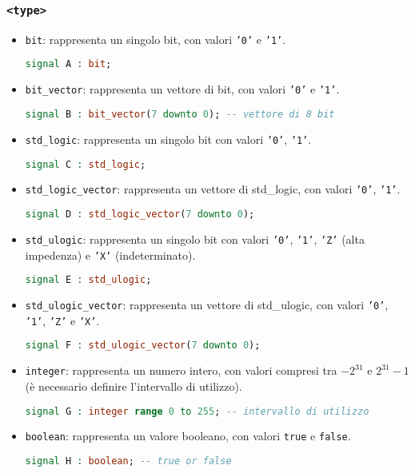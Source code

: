         \subsubsection{\texttt{<type>}}
        \begin{itemize}
        \setlength\itemsep{0pt}
            \item \texttt{bit}: rappresenta un singolo bit, con valori \texttt{'0'} e \texttt{'1'}.
            \begin{lstlisting}[language=VHDL]
signal A : bit;
            \end{lstlisting}
            \item \texttt{bit\_vector}: rappresenta un vettore di bit, con valori \texttt{'0'} e \texttt{'1'}.
            \begin{lstlisting}[language=VHDL]
signal B : bit_vector(7 downto 0); -- vettore di 8 bit
            \end{lstlisting}
            \item \texttt{std\_logic}: rappresenta un singolo bit con valori \texttt{'0'}, \texttt{'1'}.
            \begin{lstlisting}[language=VHDL]
signal C : std_logic;
            \end{lstlisting}
            \item \texttt{std\_logic\_vector}: rappresenta un vettore di std\_logic, con valori \texttt{'0'}, \texttt{'1'}.
            \begin{lstlisting}[language=VHDL]
signal D : std_logic_vector(7 downto 0);
            \end{lstlisting}
            \item \texttt{std\_ulogic}: rappresenta un singolo bit con valori \texttt{'0'}, \texttt{'1'}, \texttt{'Z'} (alta impedenza) e \texttt{'X'} (indeterminato).
            \begin{lstlisting}[language=VHDL]
signal E : std_ulogic;
            \end{lstlisting}
            \item \texttt{std\_ulogic\_vector}: rappresenta un vettore di std\_ulogic, con valori \texttt{'0'}, \texttt{'1'}, \texttt{'Z'} e \texttt{'X'}.
            \begin{lstlisting}[language=VHDL]
signal F : std_ulogic_vector(7 downto 0);
            \end{lstlisting}
            \item \texttt{integer}: rappresenta un numero intero, con valori compresi tra $-2^{31}$ e $2^{31}-1$ (è necessario definire l'intervallo di utilizzo).
            \begin{lstlisting}[language=VHDL]
signal G : integer range 0 to 255; -- intervallo di utilizzo
            \end{lstlisting}
            \item \texttt{boolean}: rappresenta un valore booleano, con valori \texttt{true} e \texttt{false}.
            \begin{lstlisting}[language=VHDL]
signal H : boolean; -- true or false
            \end{lstlisting}
        \end{itemize}
